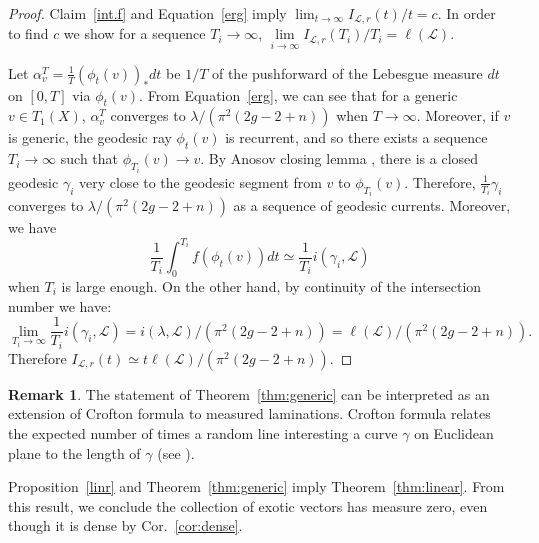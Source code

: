 \documentclass[11pt]{article} %
\theoremstyle{plain}
\theoremstyle{definition}
\newtheorem{rmk}[thm]{Remark}
\numberwithin{equation}{section}
\begin{document}
\begin{proof}
Claim~\ref{int.f} and Equation~\ref{erg} imply $\lim_{t\to\infty}I_{\mathcal{L},r}(t)/t=c$. In order to find $c$ we show for a sequence $T_i \rightarrow \infty$, $\lim \limits_{i \rightarrow \infty} I_{\mathcal{L},r}(T_i)/T_i=\ell(\mathcal{L})$.

Let $\alpha_v^T=\frac1T(\phi_t(v))_*dt$ be $1/T$ of the pushforward of the Lebesgue measure $dt$ on $[0,T]$ via $\phi_t(v)$. From Equation~\ref{erg}, we can see that for a generic $v\in T_1(X)$, $\alpha_v^T$ converges to $\lambda/(\pi^2(2g-2+n))$ when $T \rightarrow \infty$. Moreover, if $v$ is generic, the geodesic ray $\phi_t(v)$ is recurrent, and so there exists a sequence $T_i\to\infty$ such that $\phi_{T_i}(v)\to v$. By Anosov closing lemma \cite{erg.g.f}, there is a closed geodesic $\gamma_i$ very close to the geodesic segment from $v$ to $\phi_{T_i}(v)$. Therefore, $\frac{1}{T_i}\gamma_i$ converges to $\lambda/(\pi^2(2g-2+n))$ as a sequence of geodesic currents. Moreover, we have
$$\frac{1}{T_i} \int_{0}^{T_i} f(\phi_t(v)) dt \simeq \frac{1}{T_i} i(\gamma_i,\mathcal{L})$$
when $T_i$ is large enough.
On the other hand, by continuity of the intersection number we have: 
$$
\lim_{T_i \rightarrow \infty} \frac{1}{T_i}i(\gamma_i, \mathcal{L})=i(\lambda, \mathcal{L})/(\pi^2(2g-2+n))= \ell(\mathcal{L})/(\pi^2(2g-2+n)).
$$
Therefore $I_{\mathcal{L},r}(t) \simeq t\ell(\mathcal{L})/(\pi^2(2g-2+n))$.
\end{proof}
\begin{rmk}
The statement of Theorem~\ref{thm:generic} can be interpreted as an extension of Crofton formula to measured laminations. Crofton formula relates the expected number of times a random line interesting a curve $\gamma$ on Euclidean plane to the length of $\gamma$ (see \cite{intgeobook}). 
\end{rmk}
Proposition~\ref{linr} and Theorem~\ref{thm:generic} imply Theorem~\ref{thm:linear}. From this result, we conclude the collection of exotic vectors has measure zero, even though it is dense by Cor.~\ref{cor:dense}.

\end{document}
